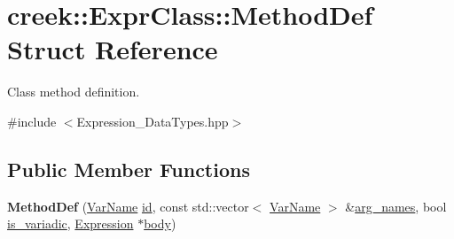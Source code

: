 \hypertarget{structcreek_1_1_expr_class_1_1_method_def}{}\section{creek\+:\+:Expr\+Class\+:\+:Method\+Def Struct Reference}
\label{structcreek_1_1_expr_class_1_1_method_def}


Class method definition.  




{\ttfamily \#include $<$Expression\+\_\+\+Data\+Types.\+hpp$>$}

\subsection*{Public Member Functions}
\begin{DoxyCompactItemize}
\item 
{\bfseries Method\+Def} (\hyperlink{classcreek_1_1_var_name}{Var\+Name} \hyperlink{structcreek_1_1_expr_class_1_1_method_def_a0c77189e3dbd4bfcd976c8882dede88f}{id}, const std\+::vector$<$ \hyperlink{classcreek_1_1_var_name}{Var\+Name} $>$ \&\hyperlink{structcreek_1_1_expr_class_1_1_method_def_a51c65f89ac9a583ac48664213a53f7e1}{arg\+\_\+names}, bool \hyperlink{structcreek_1_1_expr_class_1_1_method_def_a201919395c2e7bbcf606f7323429c9a2}{is\+\_\+variadic}, \hyperlink{classcreek_1_1_expression}{Expression} $\ast$\hyperlink{structcreek_1_1_expr_class_1_1_method_def_ac4d9959cb4d880d5fe8d844f32252888}{body})\hypertarget{structcreek_1_1_expr_class_1_1_method_def_a9207921ff1aaf89b3525ed79d1152641}{}\label{structcreek_1_1_expr_class_1_1_method_def_a9207921ff1aaf89b3525ed79d1152641}

\end{DoxyCompactItemize}
